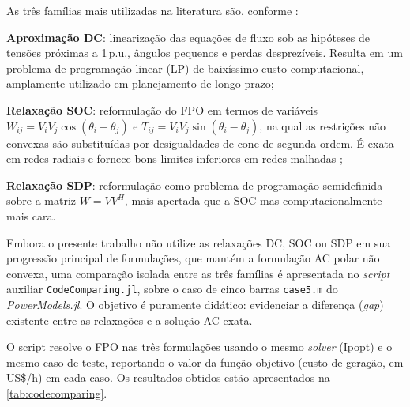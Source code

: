 As três famílias mais utilizadas na literatura são, conforme :

\begin{alineascomponto}
    \item \textbf{Aproximação DC}: linearização das equações de fluxo sob as hipóteses de tensões próximas a 1\,p.u., ângulos pequenos e perdas desprezíveis. Resulta em um problema de programação linear (LP) de baixíssimo custo computacional, amplamente utilizado em planejamento de longo prazo;
    \item \textbf{Relaxação SOC}: reformulação do FPO em termos de variáveis $W_{ij} = V_i V_j \cos(\theta_i - \theta_j)$ e $T_{ij} = V_i V_j \sin(\theta_i - \theta_j)$, na qual as restrições não convexas são substituídas por desigualdades de cone de segunda ordem. É exata em redes radiais e fornece bons limites inferiores em redes malhadas \cite{yuan2019soc};
    \item \textbf{Relaxação SDP}: reformulação como problema de programação semidefinida sobre a matriz $W = V V^H$, mais apertada que a SOC mas computacionalmente mais cara.
\end{alineascomponto}

Embora o presente trabalho não utilize as relaxações DC, SOC ou SDP em sua progressão principal de formulações, que mantém a formulação AC polar não convexa, uma comparação isolada entre as três famílias é apresentada no \textit{script} auxiliar \texttt{CodeComparing.jl}, sobre o caso de cinco barras \texttt{case5.m} do \textit{PowerModels.jl}. O objetivo é puramente didático: evidenciar a diferença (\textit{gap}) existente entre as relaxações e a solução AC exata.

O script resolve o FPO nas três formulações usando o mesmo \textit{solver} (Ipopt) e o mesmo caso de teste, reportando o valor da função objetivo (custo de geração, em US\$/h) em cada caso. Os resultados obtidos estão apresentados na \autoref{tab:codecomparing}.

\begin{table}[!htb]
\captionsetup{width=10cm}
\end{table}

